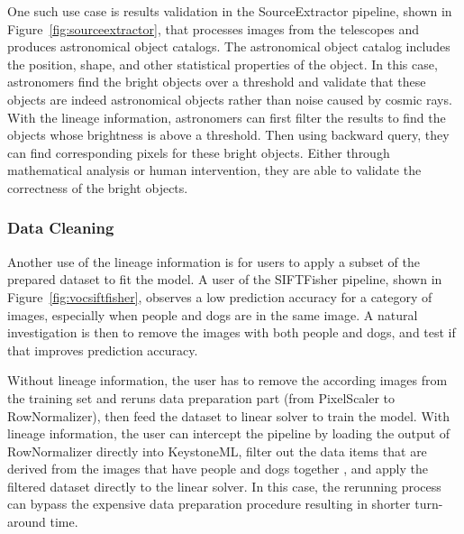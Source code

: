 \documentclass{sig-alternate}
\begin{document}
One such use case is results validation in the SourceExtractor pipeline, shown in Figure~\ref{fig:sourceextractor},
that processes images from the telescopes and produces astronomical object catalogs. 
The astronomical object catalog includes the position, shape, and other statistical properties of the object.
In this case, astronomers find the bright objects over a threshold and validate that these objects are indeed astronomical objects rather
than noise caused by cosmic rays.
With the lineage information, astronomers can first filter the results to find the objects whose brightness is above a threshold.
Then using backward query, they can find corresponding pixels for these bright objects. 
Either through mathematical analysis or human intervention, they are able to validate the correctness of the bright objects.

\subsubsection{Data Cleaning}
\label{sec:Back-Case-Cleaning}
Another use of the lineage information is for users to apply a subset of the prepared dataset to fit the model. 
A user of the SIFTFisher pipeline, shown in Figure~\ref{fig:vocsiftfisher}, observes a low prediction accuracy for a category of images, especially 
when people and dogs are in the same image. A natural investigation is then to remove the images with both people and dogs,
and test if that improves prediction accuracy.

Without lineage information, the user has to remove the according images from the training set and reruns data
preparation part (from PixelScaler to RowNormalizer), then feed the dataset to linear solver to train the model.
With lineage information, the user can intercept the pipeline by loading the output of RowNormalizer directly into KeystoneML,
filter out the data items that are derived from the images that have people and dogs together , and apply the filtered dataset directly to the linear solver.
In this case, the rerunning process can bypass the expensive data preparation procedure resulting in shorter turn-around time.
\end{document}
